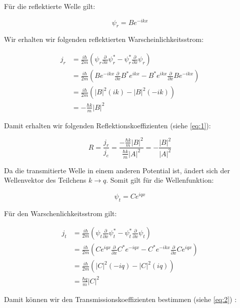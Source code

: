 Für die reflektierte Welle gilt:

\begin{equation}
  \label{eq:7}
  \psi_r = Be^{-ikx}
\end{equation}

Wir erhalten wir folgenden reflektierten Warscheinlichkeitsstrom:

\begin{align}
  \label{eq:8}
  j_r &= \frac{i\hbar}{2m}\left(\psi_r \frac{\partial}{\partial x} \psi^*_r - \psi^*_r \frac{\partial}{\partial x}\psi_r\right)\\
&= \frac{i\hbar}{2m}\left(Be^{-ikx} \frac{\partial}{\partial x} B^*e^{ikx} - B^*e^{ikx}\frac{\partial}{\partial x}Be^{-ikx}\right)\\
&= \frac{i\hbar}{2m}\left(|B|^2(ik)  -|B|^2(-ik)\right)\\
&= -\frac{\hbar k}{m}|B|^2
\end{align}

Damit erhalten wir folgenden Reflektionskoeffizienten (siehe \eqref{eq:1}):

\begin{equation}
  \label{eq:9}
  R = \frac{j_r}{j_e} = \frac{-\frac{\hbar k}{m}|B|^2 }{\frac{\hbar k}{m}|A|^2} = -\frac{|B|^2}{|A|^2}
\end{equation}


Da die transmitierte Welle in einem anderen Potential ist, ändert sich der Wellenvektor des Teilchens \(k \rightarrow q\). Somit gilt für die Wellenfunktion:

\begin{equation}
  \label{eq:10}
    \psi_t = Ce^{iqx}
\end{equation}

Für den Warschenlichkeitsstrom gilt:

\begin{align}
  \label{eq:11}
  j_t &= \frac{i\hbar}{2m}\left(\psi_t \frac{\partial}{\partial x} \psi^*_t - \psi^*_t \frac{\partial}{\partial x}\psi_t\right)\\
&= \frac{i\hbar}{2m}\left(Ce^{iqx} \frac{\partial}{\partial x} C^*e^{-iqx} - C^*e^{-ikx}\frac{\partial}{\partial x}Ce^{iqx}\right)\\
&= \frac{i\hbar}{2m}\left(|C|^2(-iq)  -|C|^2(iq)\right)\\
&= \frac{\hbar q}{m}|C|^2
\end{align}


Damit können wir den Transmissionskoeffizienten bestimmen (siehe \eqref{eq:2}) :


